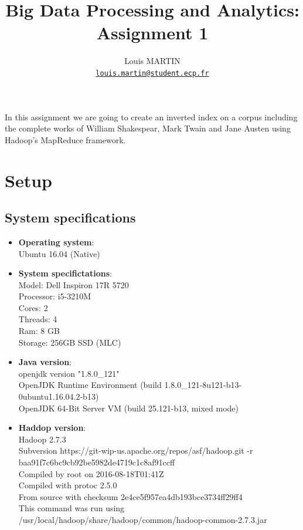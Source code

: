 \documentclass[a4paper,10pt]{article}
\begin{document}
\title{Big Data Processing and Analytics: Assignment 1}
\author{Louis MARTIN\\
\href{mailto:louis.martin@student.ecp.fr}{\tt louis.martin@student.ecp.fr}}

\maketitle

In this assignment we are going to create an inverted index on a corpus
including the complete works of William Shakespear, Mark Twain and Jane Austen
using Hadoop's MapReduce framework.

\section{Setup}
\subsection{System specifications}

\begin{itemize}
    \item \textbf{Operating system}:\\
    Ubuntu 16.04 (Native)
    \item \textbf{System specifictations}:\\
    Model: Dell Inspiron 17R 5720\\
    Processor: i5-3210M\\
    Cores: 2\\
    Threads: 4\\
    Ram: 8 GB\\
    Storage: 256GB SSD (MLC)
    \item \textbf{Java version}:\\
    openjdk version "1.8.0\_121"\\
    OpenJDK Runtime Environment (build 1.8.0\_121-8u121-b13-0ubuntu1.16.04.2-b13)\\
    OpenJDK 64-Bit Server VM (build 25.121-b13, mixed mode)
    \item \textbf{Haddop version}:\\
    Hadoop 2.7.3\\
    Subversion https://git-wip-us.apache.org/repos/asf/hadoop.git -r baa91f7c6bc9cb92be5982de4719c1c8af91ccff\\
    Compiled by root on 2016-08-18T01:41Z\\
    Compiled with protoc 2.5.0\\
    From source with checksum 2e4ce5f957ea4db193bce3734ff29ff4\\
    This command was run using /usr/local/hadoop/share/hadoop/common/hadoop-common-2.7.3.jar\\

\end{itemize}
\end{document}
